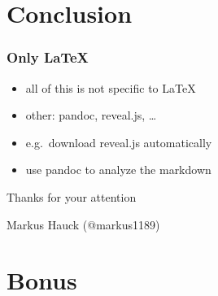 \documentclass{beamer}
\begin{document}
\section{Conclusion}\label{sec:conclusion}

\begin{frame}
  \frametitle{Only LaTeX}
  \begin{itemize}
  \item all of this is not specific to LaTeX
  \item other: pandoc, reveal.js, \ldots{}
  \item e.g.\ download reveal.js automatically
  \item use pandoc to analyze the markdown
  \end{itemize}
\end{frame}

\begin{frame}
  \begin{center}
    \Huge
    Thanks for your attention
  \end{center}
  \begin{center}
    \Huge
    Markus Hauck (@markus1189)
  \end{center}
\end{frame}

\begin{frame}
  \tableofcontents{}
\end{frame}

\appendix{}

\section*{Bonus}\label{sec:bonus}
\end{document}
